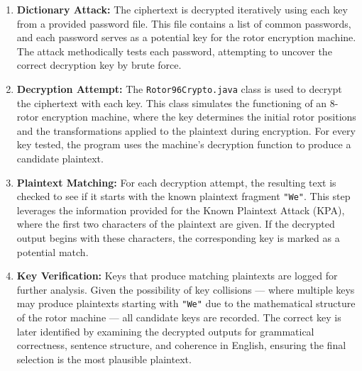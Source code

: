 \documentclass{article}
\begin{document}
\begin{enumerate}
    \item \textbf{Dictionary Attack:} The ciphertext is decrypted iteratively using each key from a provided password file. This file contains a list of common passwords, and each password serves as a potential key for the rotor encryption machine. The attack methodically tests each password, attempting to uncover the correct decryption key by brute force.
    
    \item \textbf{Decryption Attempt:} The \texttt{Rotor96Crypto.java} class is used to decrypt the ciphertext with each key. This class simulates the functioning of an 8-rotor encryption machine, where the key determines the initial rotor positions and the transformations applied to the plaintext during encryption. For every key tested, the program uses the machine's decryption function to produce a candidate plaintext.
    
    \item \textbf{Plaintext Matching:} For each decryption attempt, the resulting text is checked to see if it starts with the known plaintext fragment \texttt{"We"}. This step leverages the information provided for the Known Plaintext Attack (KPA), where the first two characters of the plaintext are given. If the decrypted output begins with these characters, the corresponding key is marked as a potential match. 
    
    \item \textbf{Key Verification:} Keys that produce matching plaintexts are logged for further analysis. Given the possibility of key collisions — where multiple keys may produce plaintexts starting with \texttt{"We"} due to the mathematical structure of the rotor machine — all candidate keys are recorded. The correct key is later identified by examining the decrypted outputs for grammatical correctness, sentence structure, and coherence in English, ensuring the final selection is the most plausible plaintext.
\end{enumerate}
\end{document}
